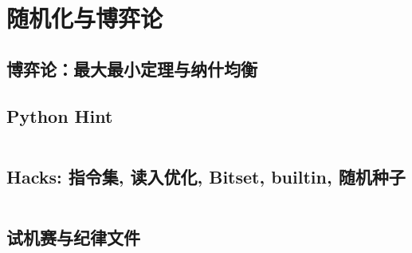 \section{随机化与博弈论}
\subsection{博弈论：最大最小定理与纳什均衡}
  
				\subsection{Python Hint}
					\inputminted{python}{src/Miscellany/py.py}
				\subsection{Hacks: 指令集, 读入优化, Bitset, builtin, 随机种子}
					\inputminted{cpp}{src/Miscellany/hack.cpp}
				\subsection{试机赛与纪律文件}
				\begin{spacing}{0.3}
					
				\end{spacing}
				
				\inputminted{sh}{src/Miscellany/bashrc}
